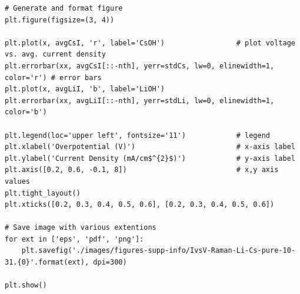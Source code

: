 \documentclass[journal=jpccck,manuscript=suppinfo,email=true]{achemso}
\begin{document}
\begin{verbatim}
# Generate and format figure
plt.figure(figsize=(3, 4))

plt.plot(x, avgCsI, 'r', label='CsOH')                 # plot voltage vs. avg. current density
plt.errorbar(xx, avgCsI[::-nth], yerr=stdCs, lw=0, elinewidth=1, color='r') # error bars
plt.plot(x, avgLiI, 'b', label='LiOH')
plt.errorbar(xx, avgLiI[::-nth], yerr=stdLi, lw=0, elinewidth=1, color='b')

plt.legend(loc='upper left', fontsize='11')            # legend
plt.xlabel('Overpotential (V)')                        # x-axis label
plt.ylabel('Current Density (mA/cm$^{2}$)')            # y-axis label
plt.axis([0.2, 0.6, -0.1, 8])                          # x,y axis values
plt.tight_layout()
plt.xticks([0.2, 0.3, 0.4, 0.5, 0.6], [0.2, 0.3, 0.4, 0.5, 0.6])

# Save image with various extentions
for ext in ['eps', 'pdf', 'png']:
    plt.savefig('./images/figures-supp-info/IvsV-Raman-Li-Cs-pure-10-31.{0}'.format(ext), dpi=300)

plt.show()
\end{verbatim}
\end{document}
